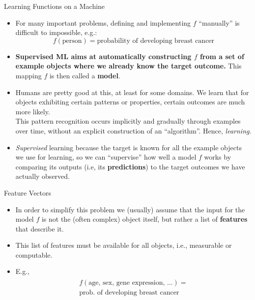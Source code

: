 \documentclass[11pt,compress,t,notes=noshow, xcolor=table]{beamer}
\begin{document}
\begin{vbframe}{Learning Functions on a Machine}
\begin{itemize}
\item For many important problems, defining and implementing $f$ \enquote{manually} is difficult to impossible, e.g.:
$$f(\textrm{person}) = \textrm{probability of developing breast cancer}$$
\item \textbf{Supervised ML aims at automatically constructing $f$ from a set of example objects where we already know the target outcome.}  This mapping $f$ is then called a \textbf{model}.
\item Humans are pretty good at this, at least for some domains. We learn that for objects exhibiting certain  patterns or properties, certain outcomes are much more likely.\\
This pattern recognition occurs implicitly and gradually through examples over time, without an explicit construction of an \enquote{algorithm}. Hence, \emph{learning}. 
\item \emph{Supervised} learning because the target is known for all the example objects we use for learning, so we can \enquote{supervise} how well a model $f$ works by comparing its outputs (i.e, its \textbf{predictions}) to the target outcomes we have actually observed.
\end{itemize}
\end{vbframe}

\begin{vbframe}{Feature Vectors}

\begin{itemize}
\item In order to simplify this problem we (usually) assume that the input for the model $f$ 
is not the (often complex) object itself, but rather a list of \textbf{features} that describe it.
\item This list of features must be available for all objects, i.e., measurable or computable.
\item E.g.,
\begin{align*}
\begin{split}
  f(\textrm{age, sex, gene expression, ...}) =\\
   \textrm{prob. of developing breast cancer}
\end{split}
\end{align*}
\end{itemize}

\end{vbframe}
\end{document}
